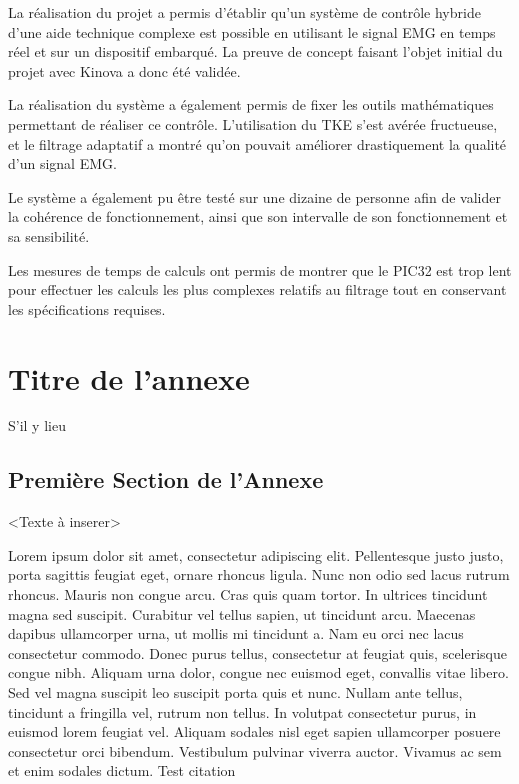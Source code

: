 \documentclass[letterpaper, twoside, 12pt, memoire, creativecommons, hyperref]{thETS}
\begin{document}
\begin{conclusion}

La réalisation du projet a permis d'établir qu'un système de contrôle hybride d'une aide technique complexe est possible en utilisant le signal EMG en temps réel et sur un dispositif embarqué. La preuve de concept faisant l'objet initial du projet avec Kinova a donc été validée. 

La réalisation du système a également permis de fixer les outils mathématiques permettant de réaliser ce contrôle. L'utilisation du TKE s'est avérée fructueuse, et le filtrage adaptatif a montré qu'on pouvait améliorer drastiquement la qualité d'un signal EMG. 

Le système a également pu être testé sur une dizaine de personne afin de valider la cohérence de fonctionnement, ainsi que son intervalle de son fonctionnement et sa sensibilité.

Les mesures de temps de calculs ont permis de montrer que le PIC32 est trop lent pour effectuer les calculs les plus complexes relatifs au filtrage tout en conservant les spécifications requises. 

\end{conclusion}




\appendix


\multiannexe %
%
\chapter{Titre de l'annexe} 

S'il y lieu

\section{Première Section de l'Annexe}
<Texte à inserer> 

Lorem ipsum dolor sit amet, consectetur adipiscing elit. Pellentesque justo justo, porta sagittis feugiat eget, ornare rhoncus ligula. Nunc non odio sed lacus rutrum rhoncus. Mauris non congue arcu. Cras quis quam tortor. In ultrices tincidunt magna sed suscipit. Curabitur vel tellus sapien, ut tincidunt arcu. Maecenas dapibus ullamcorper urna, ut mollis mi tincidunt a. Nam eu orci nec lacus consectetur commodo. Donec purus tellus, consectetur at feugiat quis, scelerisque congue nibh. Aliquam urna dolor, congue nec euismod eget, convallis vitae libero. Sed vel magna suscipit leo suscipit porta quis et nunc. Nullam ante tellus, tincidunt a fringilla vel, rutrum non tellus. In volutpat consectetur purus, in euismod lorem feugiat vel. Aliquam sodales nisl eget sapien ullamcorper posuere consectetur orci bibendum. Vestibulum pulvinar viverra auctor. Vivamus ac sem et enim sodales dictum. Test citation \cite{Bha10}
\end{document}
